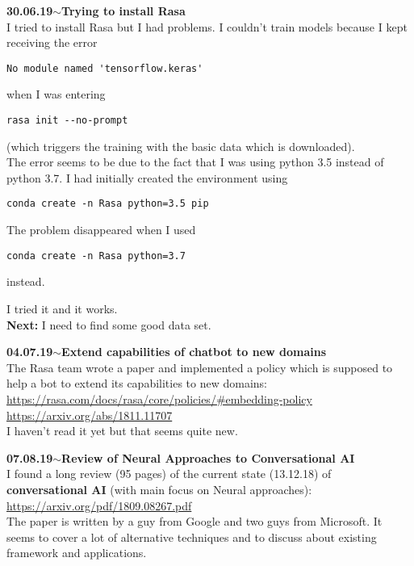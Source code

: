 \documentclass[11pt,a4paper]{article}
\newenvironment{loggentry}[2]%
{\noindent\textbf{#1}\hspace{1cm}$\mathbf{\sim}$\text{ }\textbf{#2}\\}{\vspace{0.5cm}}
\begin{document}
\begin{loggentry}{30.06.19}{Trying to install Rasa}

I tried to install Rasa but I had problems. I couldn't train models because I kept receiving the error
\begin{verbatim}
No module named 'tensorflow.keras'
\end{verbatim}
when I was entering
\begin{verbatim}
rasa init --no-prompt
\end{verbatim}
(which triggers the training with the basic data which is downloaded).\\
The error seems to be due to the fact that I was using python 3.5 instead of python 3.7. I had initially created the environment using
\begin{verbatim}
conda create -n Rasa python=3.5 pip
\end{verbatim}
The problem disappeared when I used 
\begin{verbatim}
conda create -n Rasa python=3.7
\end{verbatim}
instead.

I tried it and it works.\\

\textbf{Next:} I need to find some good data set.

\end{loggentry}

\begin{loggentry}{04.07.19}{Extend capabilities of chatbot to new domains}

The Rasa team wrote a paper and implemented a policy which is supposed to help a bot to extend its capabilities to new domains:\\
\url{https://rasa.com/docs/rasa/core/policies/#embedding-policy}\\
\url{https://arxiv.org/abs/1811.11707}\\
I haven't read it yet but that seems quite new.

\end{loggentry}

\begin{loggentry}{07.08.19}{Review of Neural Approaches to Conversational AI}

I found a long review (95 pages) of the current state (13.12.18) of \textbf{conversational AI} (with main focus on Neural approaches):\\
\url{https://arxiv.org/pdf/1809.08267.pdf}\\
The paper is written by a guy from Google and two guys from Microsoft. It seems to cover a lot of alternative techniques and to discuss about existing framework and applications.

\end{loggentry}
\end{document}
